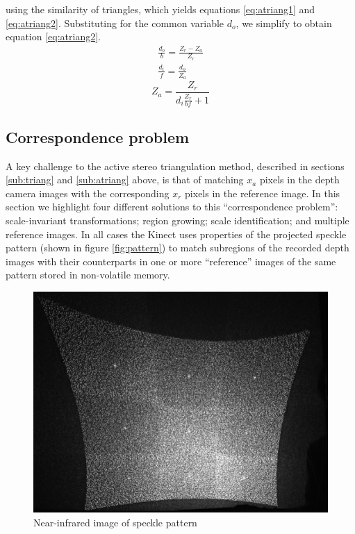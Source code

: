 using the similarity of triangles, which yields equations \ref{eq:atriang1} and
\ref{eq:atriang2}. Substituting for the common variable $d_o$, we simplify to
obtain equation \ref{eq:atriang2}.
\begin{align} 
    \frac{d_o}{b} = \frac{Z_r - Z_a}{Z_r} \label{eq:atriang1}\\
    \frac{d_i}{f} = \frac{d_o}{Z_a} \label{eq:atriang2}
\end{align}
\begin{equation} \label{eq:atriang2}
    Z_a = \frac{Z_r}{d_i \frac{Z_r}{b f} + 1}
\end{equation}


\subsection{Correspondence problem}
\label{sub:corr}

A key challenge to the active stereo triangulation method, described in sections
\ref{sub:triang} and \ref{sub:atriang} above, is that of matching $x_a$ pixels
in the depth camera images with the corresponding $x_r$ pixels in the reference
image. In this section we highlight four different solutions to this
``correspondence problem'': scale-invariant transformations; region growing;
scale identification; and multiple reference images. In all cases the Kinect
uses properties of the projected speckle pattern (shown in figure
\ref{fig:pattern}) to match subregions of the recorded depth images with their
counterparts in one or more ``reference'' images of the same pattern stored in
non-volatile memory.

\begin{figure}[ht]
    \begin{center}
        \includegraphics[width=1.0\textwidth]{images/whole_pattern}        
        \caption{Near-infrared image of speckle pattern}
        \label{fig:pattern1}
    \end{center}
\end{figure}


